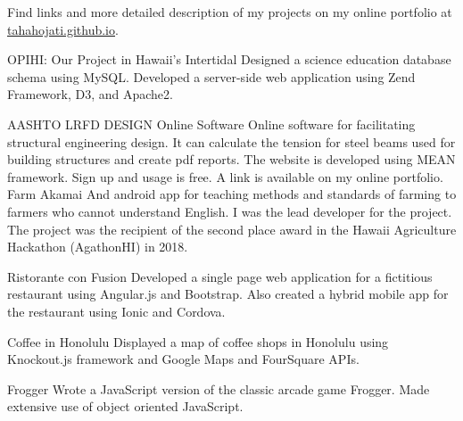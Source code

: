 
	Find links and more detailed description of my projects on my online portfolio at \mbox{\href{http://tahahojati.github.io}{tahahojati.github.io}}.
\begin{cventries}
	\cventry
	{OPIHI: Our Project in Hawaii's Intertidal}
	{}
	{}
	{}
	{Designed a science education database schema using MySQL. Developed a server-side web application using Zend Framework, D3, and Apache2.}
	
	\cventry
	{AASHTO LRFD DESIGN Online Software}
	{}
	{}
	{}
	{Online software for facilitating structural engineering design. It can calculate the tension for steel beams used for building structures and create pdf reports. The website is developed using MEAN framework. Sign up and usage is free. A link is available on my online portfolio. }
	\cventry
	{Farm Akamai}
	{}
	{}
	{}
	{And android app for teaching methods and standards of farming to farmers who cannot understand English. I was the lead developer for the project. The project was the recipient of the second place award in the Hawaii Agriculture Hackathon (AgathonHI) in 2018.}
	
	\cventry
	{Ristorante con Fusion
	}
	{}
	{}
	{}
	{Developed a single page web application for a fictitious restaurant using Angular.js and Bootstrap.  Also created a hybrid mobile app for the restaurant using Ionic and Cordova.}

	\cventry
	{Coffee in Honolulu
	}
	{}
	{}
	{}
	{Displayed a map of coffee shops in Honolulu using Knockout.js framework and Google Maps and FourSquare APIs.}

	\cventry
	{Frogger
	}
	{}
	{}
	{}
	{Wrote a JavaScript version of the classic arcade game Frogger. Made extensive use of object oriented JavaScript.}



\end{cventries}

